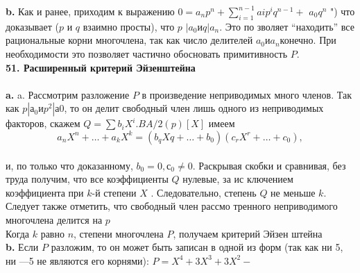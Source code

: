 \hspace*{15pt}\textbf{b.} Как и ранее, приходим к выражению $0 = a_{n}p^{n} + \sum^{n-1}_{i=1}a{i}p^{i}q^{n-1}+$\linebreak
$a_{0}q^n$ ") что доказывает ($p$ и $q$ взаимно просты), что $p$ $| a_0 и q | a_n$. Это по­\linebreak
зволяет “находить” все рациональные корни многочлена, так как число\linebreak
делителей $a_0 и a_n $конечно. При необходимости это позволяет частично\linebreak
обосновать примитивность $P$.\\
\newpage
\noindent\textbf{51. Расширенный критерий Эйзенштейна}\\
\\
\hspace*{15pt}\textbf{a.} a. Рассмотрим разложение $P$ в произведение неприводимых много­\linebreak
членов. Так как $p | а_0 и p^{2} |а0$, то он делит свободный член лишь одного\linebreak
из неприводимых факторов, скажем  $Q = \sum b_{i}X^{i}. B A/2(p)[X]$ имеем
$$a_{n}X^{n}+\ldots+a_{k}X^{k} = (b_{q}X{q}+\ldots+b_0)(c_{r}X^{r}+\ldots+c_0),$$
\\
\noindent и, по только что доказанному, $b_0 = 0, с_0 \neq 0.$ Раскрывая скобки и\linebreak
сравнивая, без труда получим, что все коэффициенты $Q$ нулевые, за ис­\linebreak
ключением коэффициента при $k$-й степени $X$ . Следовательно, степень\linebreak
$Q$ не меньше $k$. Следует также отметить, что свободный член рассмо­\linebreak
тренного неприводимого многочлена делится на $p$\\
\hspace*{0pt} Когда $k$ равно $n$, степени многочлена $P$, получаем критерий Эйзен­\linebreak
штейна\\
\hspace*{15pt}\textbf{b.} Если $P$ разложим, то он может быть записан в одной из форм\linebreak
(так как ни 5, ни —5 не являются его корнями): $P = X^{4} + 3X^{3} + 3X^{2} -$\linebreak
